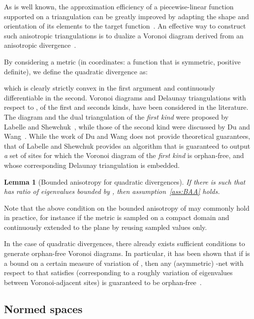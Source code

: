 \documentclass[11pt]{article}
\newtheorem{lemma}{Lemma}
\begin{document}
As is well known, the approximation efficiency of a 
	piecewise-linear function supported on a triangulation can be greatly improved by 
	adapting the shape and orientation of its elements to the target function~\cite{triangle,DAzevedo,DBLP:conf/imr/CanasG06}. 
An effective way to construct such anisotropic triangulations is to dualize a Voronoi diagram 
	derived from an anisotropic divergence~\cite{LS,DW}. 

By considering a  metric 
	(in coordinates: a function  that is symmetric, positive definite), 
	we define the quadratic divergence as:

which is clearly strictly convex in the first argument and continuously differentiable in the second. 
Voronoi diagrams and Delaunay triangulations with respect to , of the first and seconds kinds, have been considered in the literature. 
The diagram and the dual triangulation of the \emph{first kind} were proposed by Labelle and Shewchuk~\cite{LS}, 
	while those of the second kind were discussed by Du and Wang~\cite{DW}. 
While the work of Du and Wang does not provide theoretical guarantees, 
	that of Labelle and Shewchuk provides an algorithm that is guaranteed to output \emph{a} set of sites for which the 
	Voronoi diagram of the \emph{first kind} is orphan-free, and whose corresponding Delaunay triangulation is embedded. 







\begin{lemma}[Bounded anisotropy for quadratic divergences]\label{lem:DQgamma}
If there is  such that  has ratio of eigenvalues bounded by ,
	then assumption~\ref{ass:BAA} holds. 
\end{lemma}

Note that the above condition on the bounded anisotropy of  may commonly hold in practice, 
for instance if the metric is sampled on a compact domain and continuously extended to the plane by reusing sampled values only. 

In the case of quadratic divergences, there already exists sufficient conditions to generate orphan-free Voronoi diagrams. 
In particular, it has been shown that if  is a bound on a certain measure of variation of , 
	then any (asymmetric) -net with respect to  that satisfies  
	(corresponding to a roughly  variation of eigenvalues between Voronoi-adjacent sites)
	is guaranteed to be orphan-free~\cite{avd}. 


\subsection{Normed spaces}\label{sec:Lp}
\end{document}
